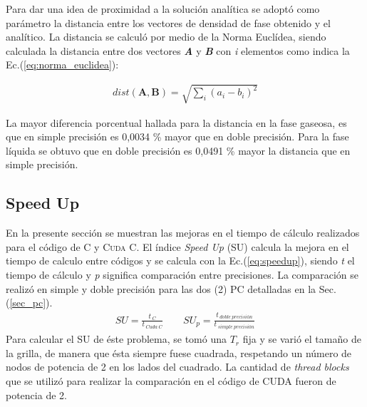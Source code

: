 
Para dar una idea de proximidad a la solución analítica se adoptó como parámetro la distancia entre los vectores de densidad de fase obtenido y el analítico. La distancia se calculó por medio de la Norma Euclídea, siendo calculada la distancia entre dos vectores \textbf{\textit{A}} y \textbf{\textit{B}} con \textit{i} elementos como indica la Ec.(\ref{eq:norma_euclidea}):

\begin{align}
dist(\mathbf{A},\mathbf{B}) = \sqrt{\sum_i {\left( a_i - b_i \right)}^2  }
\label{eq:norma_euclidea}
\end{align}


La mayor diferencia porcentual hallada para la distancia en la fase gaseosa, es que en simple precisión es 0,0034 \% mayor que en doble precisión. Para la fase líquida se obtuvo que en doble precisión es 0,0491 \% mayor la distancia que en simple precisión.


%

\newpage

\subsection{Speed Up}

En la presente sección se muestran las mejoras en el tiempo de cálculo realizados para el código de \textsc{C} y \textsc{Cuda C}. El índice \textit{Speed Up} (SU) calcula la mejora en el tiempo de calculo entre códigos y se calcula con la Ec.(\ref{eq:speedup}), siendo \textit{t} el tiempo de cálculo y \textit{p} significa comparación entre precisiones. La comparación se realizó en simple y doble precisión para las dos (2) PC detalladas en la Sec. (\ref{sec_pc}).
\begin{align}
	SU = \frac{t_{\>C}}{t_{\>Cuda \> C}} \qquad 	{SU}_p = \frac{t_{\>doble \> precisión}}{t_{\>simple \> precisión}} 
	\label{eq:speedup}
\end{align}
Para calcular el \textsc{SU} de éste problema, se tomó una $T_r$ fija y se varió el tamaño de la grilla, de manera que ésta siempre fuese cuadrada, respetando un número de nodos de potencia de 2 en los lados del cuadrado. La cantidad de \textit{thread blocks} que se utilizó para realizar la comparación en el código de \textsc{CUDA} fueron de potencia de 2.

